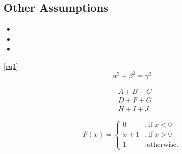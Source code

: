 \documentclass{mcmthesis}
\begin{document}
\subsection{Other Assumptions}
\lipsum[6]
\begin{itemize}

\item
\item
\item

\end{itemize}

\lipsum[7]
\autoref{eq1}
\begin{equation}\label{eq1}
    \alpha^2 + \beta^2 = \gamma^2
\end{equation}

\begin{equation}
    \begin{split}
        &A+B+C\\
        &D+F+G\\
        &H+I+J
    \end{split}
\end{equation}



\begin{equation}
    F(x)=
        \begin{cases}
            0&,\text{if $x<0$}\\
            x+1&,\text{if $x>0$}\\
            1&,\text{otherwise.}
        \end{cases}
\end{equation}
\end{document}
